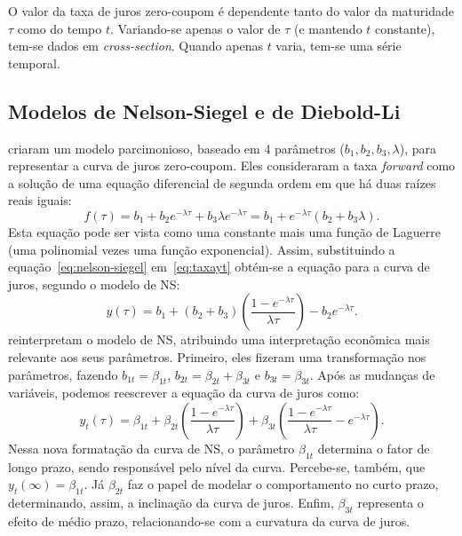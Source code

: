 \documentclass[
	12pt,				%
	openright,			%
	oneside,			%
	a4paper,			%
	english,			%
	brazil				%
	]{dissertacao-ufrgs-abntex2}
\begin{document}
O valor da taxa de juros zero-coupom é dependente tanto do valor da maturidade $\tau$ como do tempo $t$. 
Variando-se apenas o valor de $\tau$ (e mantendo $t$ constante),
tem-se dados em \emph{cross-section}. Quando apenas $t$ varia, tem-se
uma série temporal.





\subsection{Modelos de Nelson-Siegel e de Diebold-Li}

 criaram um modelo parcimonioso, baseado em 4 parâmetros
($b_{1},b_{2},b_{3},\lambda$), para representar a curva de juros
zero-coupom. Eles consideraram a taxa \emph{forward} como a solução de uma
equação diferencial de segunda ordem em que há duas raízes reais iguais:
\begin{equation} \label{eq:nelson-siegel}
f(\tau)=b_{1}+b_{2}e^{-\lambda\tau}+b_{3}\lambda e^{-\lambda\tau}=b_1+e^{-\lambda \tau}(b_2+b_3 \lambda).
\end{equation}
Esta equação pode ser vista como uma constante mais uma função de
Laguerre (uma polinomial vezes uma função exponencial). Assim, substituindo a equação~\ref{eq:nelson-siegel} em~\ref{eq:taxayt}
obtém-se a equação para a curva de juros, segundo o modelo de NS:
\begin{equation}
y(\tau)=b_{1}+(b_{2}+b_{3})\left(\frac{1-e^{-\lambda\tau}}{\lambda\tau}\right)-b_{2}e^{-\lambda\tau}.
\end{equation}
 reinterpretam o modelo de NS, atribuindo uma interpretação econômica mais relevante
aos seus parâmetros. Primeiro, eles fizeram uma transformação nos
parâmetros, fazendo $b_{1t}=\beta_{1t}$, $b_{2t}=\beta_{2t}+\beta_{3t}$
e $b_{3t}=\beta_{3t}$. Após as mudanças de variáveis, podemos reescrever a equação da curva de juros como:
\begin{equation}
y_t(\tau)=\beta_{1t}+\beta_{2t}\left(\frac{1-e^{-\lambda\tau}}{\lambda\tau}\right)+\beta_{3t}\left(\frac{1-e^{-\lambda\tau}}{\lambda\tau}-e^{-\lambda\tau}\right).
\end{equation}
Nessa nova formatação da curva de NS, o parâmetro $\beta_{1t}$ determina
o fator de longo prazo, sendo responsável pelo nível da curva. Percebe-se,
também, que $y_{t}(\infty)=\beta_{1t}$. Já $\beta_{2t}$ faz o papel
de modelar o comportamento no curto prazo, determinando, assim, a
inclinação da curva de juros. Enfim, $\beta_{3t}$ representa o efeito
de médio prazo, relacionando-se com a curvatura da curva de juros.
\end{document}

